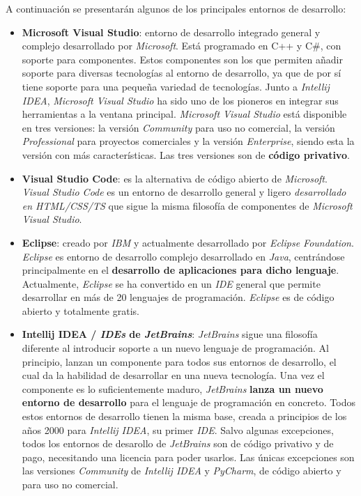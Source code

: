 \noindent A continuación se presentarán algunos de los principales
entornos de desarrollo:
\begin{itemize}
    \item \textbf{Microsoft Visual Studio}\cite{VISUALSTUDIO}: entorno de desarrollo
    integrado general y complejo desarrollado por \textit{Microsoft}.
    Está programado en C++ y C\#, con soporte para componentes.
    Estos componentes son los que permiten añadir soporte para diversas tecnologías
    al entorno de desarrollo, ya que de por sí tiene soporte para una pequeña
    variedad de tecnologías.
    Junto a \textit{Intellij IDEA}, \textit{Microsoft Visual Studio} ha sido uno
    de los pioneros en integrar sus herramientas a la ventana principal.
    \textit{Microsoft Visual Studio} está disponible en tres versiones: la versión
    \textit{Community} para uso no comercial, la versión \textit{Professional} para
    proyectos comerciales y la versión \textit{Enterprise}, siendo esta la versión
    con más características.
    Las tres versiones son de \textbf{código privativo}.
    \item \textbf{Visual Studio Code}\cite{VISUALSTUDIOCODE}:
    es la alternativa de código abierto de \textit{Microsoft}.
    \textit{Visual Studio Code} es un entorno de desarrollo general
    y ligero \textit{desarrollado en HTML/CSS/TS} que sigue la misma filosofía
    de componentes de \textit{Microsoft Visual Studio}.
    \item \textbf{Eclipse}\cite{ECLIPSE}: creado por \textit{IBM} y actualmente
    desarrollado por \textit{Eclipse Foundation}.
    \textit{Eclipse} es entorno de desarrollo complejo desarrollado en \textit{Java},
    centrándose principalmente en el \textbf{desarrollo de aplicaciones para dicho lenguaje}.
    Actualmente, \textit{Eclipse} se ha convertido en un \textit{IDE} general que
    permite desarrollar en más de 20 lenguajes de programación.
    \textit{Eclipse} es de código abierto y totalmente gratis.
    \item \textbf{Intellij IDEA / \textit{IDEs} de \textit{JetBrains}}\cite{INTELLIJIDEA}:
    \textit{JetBrains} sigue una filosofía diferente al introducir
    soporte a un nuevo lenguaje de programación.
    Al principio, lanzan un componente para todos sus entornos de desarrollo,
    el cual da la habilidad de desarrollar en una nueva tecnología.
    Una vez el componente es lo suficientemente maduro, \textit{JetBrains}
    \textbf{lanza un nuevo entorno de desarrollo} para el lenguaje de programación
    en concreto.
    Todos estos entornos de desarrollo tienen la misma base, creada a
    principios de los años 2000 para \textit{Intellij IDEA}, su primer \textit{IDE}.
    Salvo algunas excepciones, todos los entornos de desarollo de \textit{JetBrains}
    son de código privativo y de pago, necesitando una licencia para poder usarlos.
    Las únicas excepciones son las versiones \textit{Community} de \textit{Intellij IDEA}
    y \textit{PyCharm}, de código abierto y para uso no comercial.
\end{itemize}